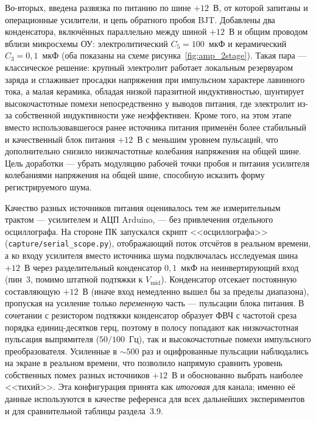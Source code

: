 Во-вторых, введена развязка по питанию по шине $+12$~В, от которой запитаны и
операционные усилители, и цепь обратного пробоя BJT. Добавлены два конденсатора,
включённых параллельно между шиной $+12$~В и общим проводом вблизи микросхемы
ОУ: электролитический $C_5=100$~мкФ и керамический $C_3=0{,}1$~мкФ (оба показаны
на схеме рисунка~\ref{fig:amp_2stage}). Такая пара --- классическое решение: крупный
электролит работает локальным резервуаром заряда и сглаживает просадки напряжения
при импульсном характере лавинного тока, а малая керамика, обладая низкой
паразитной индуктивностью, шунтирует высокочастотные помехи непосредственно у
выводов питания, где электролит из-за собственной индуктивности уже неэффективен.
Кроме того, на этом этапе вместо использовавшегося ранее источника питания
применён более стабильный и качественный блок питания $+12$~В с меньшим уровнем
пульсаций, что дополнительно снизило низкочастотные колебания напряжения на общей
шине. Цель доработки --- убрать модуляцию рабочей точки пробоя и питания усилителя
колебаниями напряжения на общей шине, способную исказить форму регистрируемого
шума.

Качество разных источников питания оценивалось тем же измерительным трактом ---
усилителем и АЦП Arduino, --- без привлечения отдельного осциллографа. На стороне
ПК запускался скрипт <<осциллографа>> (\texttt{capture/serial\_scope.py}),
отображающий поток отсчётов в реальном времени, а ко входу усилителя вместо
источника шума подключалась исследуемая шина $+12$~В через разделительный
конденсатор $0{,}1$~мкФ на неинвертирующий вход (пин~3, помимо штатной подтяжки к
$V_\mathrm{mid}$). Конденсатор отсекает постоянную составляющую $+12$~В (иначе
вход немедленно вышел бы за пределы диапазона), пропуская на усиление только
\emph{переменную} часть --- пульсации блока питания. В сочетании с резистором
подтяжки конденсатор образует ФВЧ с частотой среза порядка единиц-десятков герц,
поэтому в полосу попадают как низкочастотная пульсация выпрямителя ($50/100$~Гц),
так и высокочастотные помехи импульсного преобразователя. Усиленные в $\sim 500$
раз и оцифрованные пульсации наблюдались на экране в реальном времени, что
позволило напрямую сравнить уровень собственных помех разных источников $+12$~В и
обоснованно выбрать наиболее <<тихий>>. Эта конфигурация принята как \emph{итоговая} для канала; именно её данные
используются в качестве референса для всех дальнейших экспериментов и для
сравнительной таблицы раздела~3.9.

